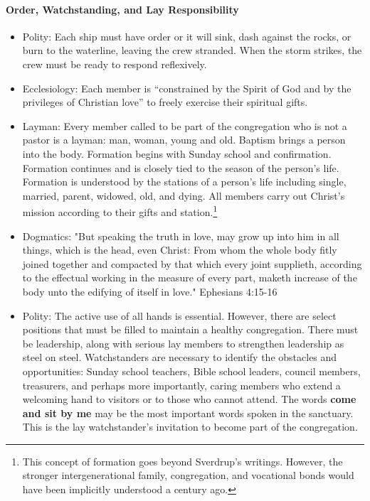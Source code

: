 \paragraph{Order, Watchstanding, and Lay Responsibility}
\begin{itemize}

\item Polity: Each ship must have order or it will sink, dash against the rocks, or burn to the waterline, leaving the crew stranded. When the storm strikes, the crew must be ready to respond reflexively.

\item Ecclesiology: Each member is ``constrained by the Spirit of God and by the privileges of Christian love'' to freely exercise their spiritual gifts.

\item Layman: Every member called to be part of the congregation who is not a pastor is a layman: man, woman, young and old. Baptism brings a person into the body. Formation begins with Sunday school and confirmation. Formation continues and is closely tied to the season of the person's life. Formation is understood by the stations of a person's life including single, married, parent, widowed, old, and dying. All members carry out Christ's mission according to their gifts and station.\footnote{This concept of formation goes beyond Sverdrup's writings. However, the stronger intergenerational family, congregation, and vocational bonds would have been implicitly understood a century ago.}      

\item Dogmatics: "But speaking the truth in love, may grow up into him in all things, which is the head, even Christ: From whom the whole body fitly joined together and compacted by that which every joint supplieth, according to the effectual working in the measure of every part, maketh increase of the body unto the edifying of itself in love." Ephesians 4:15-16 

\item Polity: The active use of all hands is essential. However, there are select positions that must be filled to maintain a healthy congregation. There must be leadership, along with serious lay members to strengthen leadership as steel on steel. Watchstanders are necessary to identify the obstacles and opportunities: Sunday school teachers, Bible school leaders, council members, treasurers, and perhaps more importantly, caring members who extend a welcoming hand to visitors or to those who cannot attend. The words \textbf{come and sit by me} may be the most important words spoken in the sanctuary. This is the lay watchstander's invitation to become part of the congregation. 


\end{itemize}
